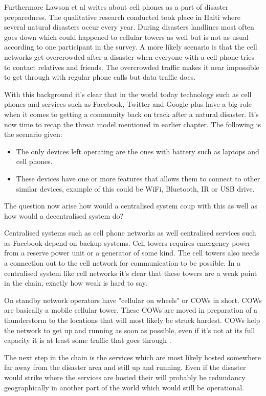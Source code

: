 Furthermore Lawson et al \cite{lawson2012} writes about cell phones as a part of disaster preparedness.
The qualitative research conducted took place in Haiti where several natural disasters occur every year.
During disasters landlines most often goes down which could happened to cellular towers as well but is not as usual according to one participant in the survey.
A more likely scenario is that the cell networks get overcrowded after a disaster when everyone with a cell phone tries to contact relatives and friends.
The overcrowded traffic makes it near impossible to get through with regular phone calls but data traffic does.

With this background it's clear that in the world today technology such as cell phones and services such as Facebook, Twitter and Google plus have a big role when it comes to getting a community back on track after a natural disaster.
It's now time to recap the threat model mentioned in earlier chapter.
The following is the scenario given:
\begin{itemize}
  \item The only devices left operating are the ones with battery such as laptops and cell phones.
  \item These devices have one or more features that allows them to connect to other similar devices, example of this could be WiFi, Bluetooth, IR or USB drive.
\end{itemize}
The question now arise how would a centralised system coup with this as well as how would a decentralised system do?

Centralised systems such as cell phone networks as well centralised services such as Facebook depend on backup systems.
Cell towers requires emergency power from a reserve power unit or a generator of some kind.
The cell towers also needs a connection out to the cell network for communication to be possible.
In a centralised system like cell networks it's clear that these towers are a weak point in the chain, exactly how weak is hard to say.

On standby network operators have "cellular on wheels" or COWs in short.
COWs are basically a mobile cellular tower.
These COWs are moved in preparation of a thunderstorm to the locations that will most likely be struck hardest.
COWs help the network to get up and running as soon as possible, even if it's not at its full capacity it is at least some traffic that goes through \cite{swartz1999}.

The next step in the chain is the services which are most likely hosted somewhere far away from the disaster area and still up and running.
Even if the disaster would strike where the services are hosted their will probably be redundancy geographically in another part of the world which would still be operational.

